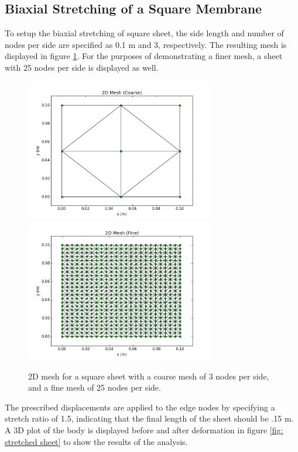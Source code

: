\documentclass[]{spie}  %
\begin{document}
\subsection{Biaxial Stretching of a Square Membrane}
To setup the biaxial stretching of square sheet, the side length and number of nodes per side are specified as 0.1 m and 3, respectively. The resulting mesh is displayed in figure \ref{fig: 2d mesh}. For the purposes of demonstrating a finer mesh, a sheet with 25 nodes per side is displayed as well.

\begin{figure}[h]
	\centering
	\includegraphics[width=3.25in]{mesh_coarse.png} \quad
	\includegraphics[width=3.25in]{mesh_fine.png} 
	\caption{2D mesh for a square sheet with a coarse mesh of 3 nodes per side, and a fine mesh of 25 nodes per side.} 
	\label{fig: 2d mesh}
\end{figure}

The prescribed displacements are applied to the edge nodes by specifying a stretch ratio of 1.5, indicating that the final length of the sheet should be .15 m. A 3D plot of the body is displayed before and after deformation in figure \ref{fig: stretched sheet} to show the results of the analysis. 
\end{document}
